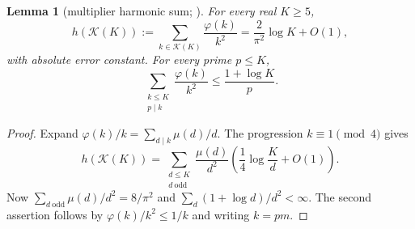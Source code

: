\documentclass[10pt,reqno]{amsart}
\newtheorem{lemma}[theorem]{Lemma}
\theoremstyle{remark}
\newcommand{\K}{\mathcal K}
\begin{document}
\begin{lemma}[multiplier harmonic sum; {\cite[Lemma 3.2]{LL}}]\label{lem:h}
For every real $K\geq5$,
\begin{equation}\label{eq:hfull}
 h(\K(K)):=\sum_{k\in\K(K)}\frac{\varphi(k)}{k^2}
       =\frac2{\pi^2}\log K+O(1),
\end{equation}
with absolute error constant.  For every prime $p\leq K$,
\begin{equation}\label{eq:hremove}
 \sum_{\substack{k\leq K\\p\mid k}}\frac{\varphi(k)}{k^2}
        \leq\frac{1+\log K}{p}.
\end{equation}
\end{lemma}
\begin{proof}
Expand $\varphi(k)/k=\sum_{d\mid k}\mu(d)/d$.  The progression
$k\equiv1\pmod4$ gives
\[
 h(\K(K))=\sum_{\substack{d\leq K\\d\ \mathrm{odd}}}\frac{\mu(d)}{d^2}
 \left(\frac14\log\frac Kd+O(1)\right).
\]
Now $\sum_{d\ \mathrm{odd}}\mu(d)/d^2=8/\pi^2$ and
$\sum_d(1+\log d)/d^2<\infty$.  The second assertion follows by
$\varphi(k)/k^2\leq1/k$ and writing $k=pm$.
\end{proof}
\end{document}
